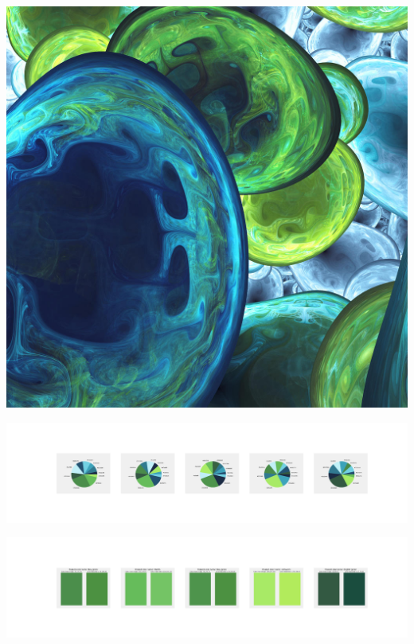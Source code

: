 \documentclass[11pt]{article}
\begin{document}
\begin{landscape}
    \begin{center}
    \includegraphics[width=\textwidth]{./nbimg/file (413).jpg}
    \end{center}

    \begin{center}
    \includegraphics[width=250mm]{./nbimg/pie-349.jpg}
    \end{center}

    \begin{center}
    \includegraphics[width=250mm]{./nbimg/peak-349.jpg}
    \end{center}
    


\end{landscape}
\end{document}
